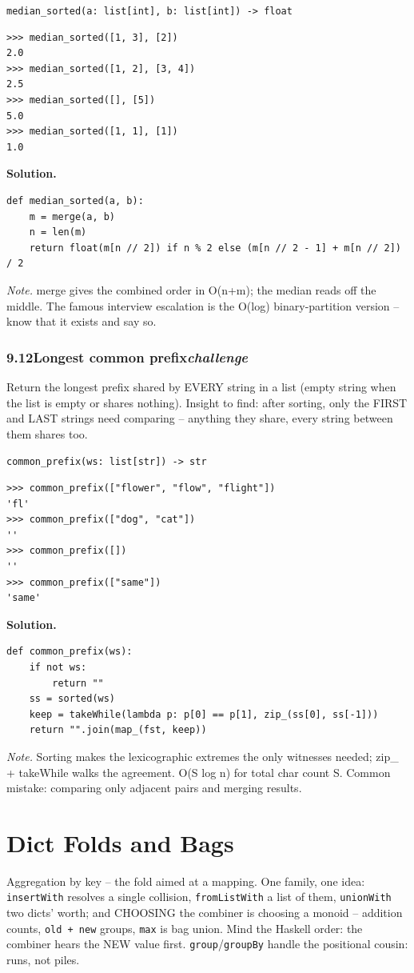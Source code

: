 \documentclass[10pt,letterpaper]{book}
\begin{document}
\noindent\texttt{median\_sorted(a: list[int], b: list[int]) -> float}
\begin{lstlisting}[style=ex]
>>> median_sorted([1, 3], [2])
2.0
>>> median_sorted([1, 2], [3, 4])
2.5
>>> median_sorted([], [5])
5.0
>>> median_sorted([1, 1], [1])
1.0
\end{lstlisting}
\noindent\textbf{Solution.}
\begin{lstlisting}[style=code]
def median_sorted(a, b):
    m = merge(a, b)
    n = len(m)
    return float(m[n // 2]) if n % 2 else (m[n // 2 - 1] + m[n // 2]) / 2
\end{lstlisting}
\noindent\textit{Note.} merge gives the combined order in O(n+m); the median reads off the middle. The famous interview escalation is the O(log) binary-partition version -- know that it exists and say so.

\subsection*{9.12\quad Longest common prefix\hfill\textnormal{\textit{challenge}}}
Return the longest prefix shared by EVERY string in a list (empty string when the list is empty or shares nothing). Insight to find: after sorting, only the FIRST and LAST strings need comparing -- anything they share, every string between them shares too.

\noindent\texttt{common\_prefix(ws: list[str]) -> str}
\begin{lstlisting}[style=ex]
>>> common_prefix(["flower", "flow", "flight"])
'fl'
>>> common_prefix(["dog", "cat"])
''
>>> common_prefix([])
''
>>> common_prefix(["same"])
'same'
\end{lstlisting}
\noindent\textbf{Solution.}
\begin{lstlisting}[style=code]
def common_prefix(ws):
    if not ws:
        return ""
    ss = sorted(ws)
    keep = takeWhile(lambda p: p[0] == p[1], zip_(ss[0], ss[-1]))
    return "".join(map_(fst, keep))
\end{lstlisting}
\noindent\textit{Note.} Sorting makes the lexicographic extremes the only witnesses needed; zip\_ + takeWhile walks the agreement. O(S log n) for total char count S. Common mistake: comparing only adjacent pairs and merging results.

\clearpage
\chapter{Dict Folds and Bags}

Aggregation by key -- the fold aimed at a mapping. One family, one idea:
\texttt{insertWith} resolves a single collision, \texttt{fromListWith} a
list of them, \texttt{unionWith} two dicts' worth; and CHOOSING the combiner
is choosing a monoid -- addition counts, \texttt{old + new} groups,
\texttt{max} is bag union. Mind the Haskell order: the combiner hears the
NEW value first. \texttt{group}/\texttt{groupBy} handle the positional
cousin: runs, not piles.
\end{document}
